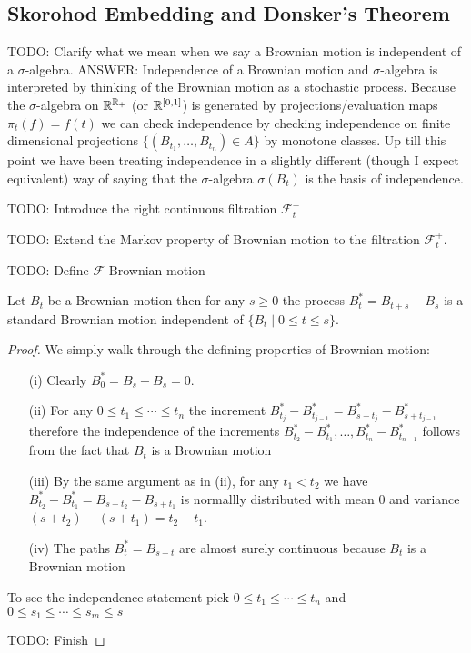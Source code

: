 \subsection{Skorohod Embedding and Donsker's Theorem}
TODO: Clarify what we mean when we say a Brownian motion is
independent of a $\sigma$-algebra.  ANSWER: Independence of a Brownian
motion and $\sigma$-algebra is interpreted by thinking of the Brownian
motion as a stochastic process.  Because the $\sigma$-algebra on
$\mathbb{R}^{\mathbb{R}_+}$ (or $\mathbb{R}^{[0,1]}$) is generated by
projections/evaluation maps $\pi_t(f) = f(t)$ we can check
independence by checking independence on finite dimensional
projections $\lbrace (B_{t_1}, \dotsc, B_{t_n}) \in A \rbrace$ by
monotone classes.  Up till this point we have been treating
independence in a slightly different (though I expect equivalent) way
of saying that the $\sigma$-algebra $\sigma(B_t)$ is the basis of independence.

TODO: Introduce the right continuous filtration $\mathcal{F}^+_t$

TODO: Extend the Markov property of Brownian motion to the filtration $\mathcal{F}^+_t$.

TODO: Define $\mathcal{F}$-Brownian motion

\begin{thm}\label{MarkovPropertyBrownianMotion}Let $B_t$ be a
  Brownian motion then for any $s \geq 0$ the process $B^*_t = B_{t + s} -
  B_s$ is a standard Brownian motion independent of $\lbrace B_t \mid
  0 \leq t \leq s \rbrace$.
\end{thm}
\begin{proof}
We simply walk through the defining properties of Brownian motion:
\begin{itemize}
\item[(i)] Clearly $B^*_0 = B_s - B_s = 0$.
\item[(ii)] For any $0 \leq t_1 \leq \cdots \leq t_n$ the increment
  $B^*_{t_j} - B^*_{t_{j-1}} = B^*_{s+ t_j} - B^*_{s+ t_{j-1}}$
  therefore the independence of the increments $B^*_{t_2} -
  B^*_{t_1}, \dotsc, B^*_{t_n} - B^*_{t_{n-1}}$ follows from the fact
  that $B_t$ is a Brownian motion
\item[(iii)]By the same argument as in (ii), for any $t_1 < t_2$ we
  have $B^*_{t_2} -  B^*_{t_1} = B_{s+t_2} -  B_{s+t_1}$ is normallly
  distributed with mean $0$ and variance $(s + t_2) - (s+t_1) = t_2 -
  t_1$.
\item[(iv)]The paths $B^*_t = B_{s+t}$ are almost surely continuous
  because $B_t$ is a Brownian motion
\end{itemize}

To see the independence statement pick $0 \leq t_1 \leq \cdots \leq
t_n$ and $0 \leq s_1 \leq \cdots \leq s_m \leq s$ 

TODO: Finish
\end{proof}

